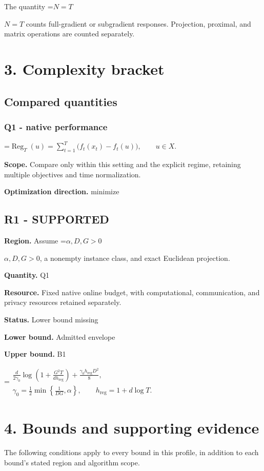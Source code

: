 \documentclass[10pt,a4paper]{article}
\newcommand{\AtlasMath}[1]{\par\begingroup\centering\setbox0=\hbox{$\displaystyle #1$}\ifdim\wd0>1.4\linewidth\typeout{ATLAS WIDE FORMULA: \the\wd0}\fi\ifdim\wd0>\linewidth\resizebox{\linewidth}{!}{\box0}\else\box0\fi\par\endgroup}
\newcommand{\AtlasInlineMath}[1]{\begingroup\setbox0=\hbox{$#1$}\ifdim\wd0>.4\linewidth\endgroup\AtlasMath{#1}\else\endgroup$#1$\fi}
\begin{document}
The quantity \AtlasInlineMath{N=T} counts full-gradient or subgradient responses. Projection, proximal, and matrix operations are counted separately.

\section{3. Complexity bracket}
\subsection{Compared quantities}
\subsubsection{Q1 - native performance}
\AtlasMath{\operatorname{Reg}_T(u)=\sum_{t=1}^{T}\bigl(f_t(x_t)-f_t(u)\bigr),\qquad u\in X.}
\textbf{Scope.} Compare only within this setting and the explicit regime, retaining multiple objectives and time normalization.

\textbf{Optimization direction.} minimize

\subsection{R1 - SUPPORTED}
\textbf{Region.} Assume \AtlasInlineMath{\alpha,D,G>0}, a nonempty instance class, and exact Euclidean projection.

\textbf{Quantity.} Q1

\textbf{Resource.} Fixed native online budget, with computational, communication, and privacy resources retained separately.

\textbf{Status.} Lower bound missing

\textbf{Lower bound.} Admitted envelope

\textbf{Upper bound.} B1

\AtlasMath{\begin{gathered}\frac d{2\gamma_0}\log\!\left(1+\frac{G^2T}{dh_{\mathrm{reg}}}\right)+\frac{\gamma_0h_{\mathrm{reg}}D^2}{8},\\ \gamma_0=\frac12\min\!\left\{\frac1{DG},\alpha\right\},\qquad h_{\mathrm{reg}}=1+d\log T.\end{gathered}}
\section{4. Bounds and supporting evidence}
The following conditions apply to every bound in this profile, in addition to each bound's stated region and algorithm scope.
\end{document}
